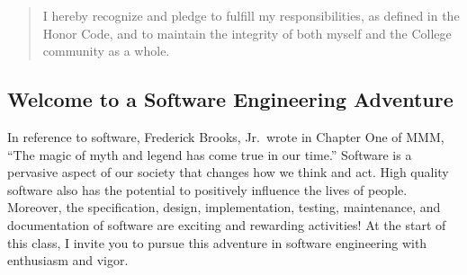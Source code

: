 \begin{quote}
I hereby recognize and pledge to fulfill my responsibilities, as defined in the Honor Code, and to maintain the
integrity of both myself and the College community as a whole.  
\end{quote}

\subsection*{Welcome to a Software Engineering Adventure}

In reference to software, Frederick Brooks, Jr.\ wrote in Chapter One of MMM, ``The magic of myth and legend has come true
in our time.'' Software is a pervasive aspect of our society that changes how we think and act.  High quality software
also has the potential to positively influence the lives of people. Moreover, the specification, design, implementation,
testing, maintenance, and documentation of software are exciting and rewarding activities!  At the start of this class,
I invite you to pursue this adventure in software engineering with enthusiasm and vigor.


